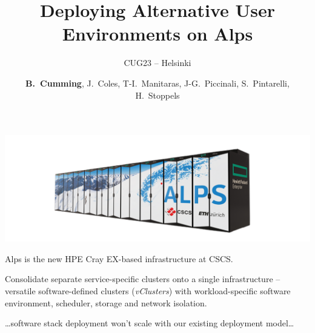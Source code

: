 \documentclass[aspectratio=43]{beamer}
\author{
    \textbf{B.~Cumming},
    J.~Coles,
    T-I.~Manitaras,
    J-G.~Piccinali,
    S.~Pintarelli,
    H.~Stoppels}
\title{\centering Deploying Alternative User Environments on Alps}
\subtitle{CUG23 -- Helsinki}
\begin{document}
\setlength{}
\setlength\leftmargini{\dimexpr\leftmargini - 1.0em\relax}

\cscstitle

\begin{frame}[fragile]{}
    \vspace{-60pt}
    \begin{center}
    \includegraphics[width=\textwidth]{images/alps.png}

    Alps is the new HPE Cray EX-based infrastructure at CSCS.

    \vspace{15pt}

        Consolidate separate service-specific clusters onto a single infrastructure -- versatile software-defined clusters (\emph{vClusters}) with workload-specific software environment, scheduler, storage and network isolation.

    \vspace{15pt}

    \dots software stack deployment won't scale with our existing deployment model\dots

    \end{center}

\end{frame}
\end{document}
